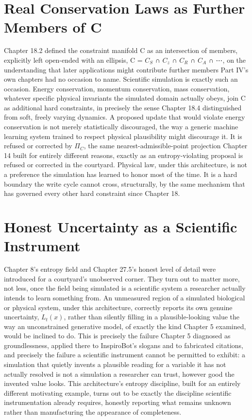 \section{Real Conservation Laws as Further Members of C}

Chapter 18.2 defined the constraint manifold C as an intersection of members, explicitly left open-ended with an ellipsis, C = \(C_S\) ∩ \(C_z\) ∩ \(C_R\) ∩ \(C_A\) ∩ ⋯, on the understanding that later applications might contribute further members Part IV's own chapters had no occasion to name. Scientific simulation is exactly such an occasion. Energy conservation, momentum conservation, mass conservation, whatever specific physical invariants the simulated domain actually obeys, join C as additional hard constraints, in precisely the sense Chapter 18.4 distinguished from soft, freely varying dynamics. A proposed update that would violate energy conservation is not merely statistically discouraged, the way a generic machine learning system trained to respect physical plausibility might discourage it. It is refused or corrected by \(\Pi_C\), the same nearest-admissible-point projection Chapter 14 built for entirely different reasons, exactly as an entropy-violating proposal is refused or corrected in the courtyard. Physical law, under this architecture, is not a preference the simulation has learned to honor most of the time. It is a hard boundary the write cycle cannot cross, structurally, by the same mechanism that has governed every other hard constraint since Chapter 18.

\section{Honest Uncertainty as a Scientific Instrument}

Chapter 8's entropy field and Chapter 27.5's honest level of detail were introduced for a courtyard's unobserved corner. They turn out to matter more, not less, once the field being simulated is a scientific system a researcher actually intends to learn something from. An unmeasured region of a simulated biological or physical system, under this architecture, correctly reports its own genuine uncertainty, \(L_t(x)\), rather than silently filling in a plausible-looking value the way an unconstrained generative model, of exactly the kind Chapter 5 examined, would be inclined to do. This is precisely the failure Chapter 5 diagnosed as groundlessness, applied there to InspiroBot's slogans and to fabricated citations, and precisely the failure a scientific instrument cannot be permitted to exhibit: a simulation that quietly invents a plausible reading for a variable it has not actually resolved is not a simulation a researcher can trust, however good the invented value looks. This architecture's entropy discipline, built for an entirely different motivating example, turns out to be exactly the discipline scientific instrumentation already requires, honestly reporting what remains unknown rather than manufacturing the appearance of completeness.


